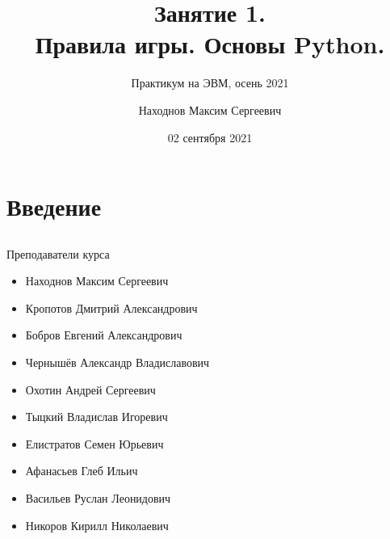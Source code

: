 \documentclass[11pt, fleqn, xcolor=x11names]{beamer}
\title[Введение в Python]{\bfseries Занятие 1. \\ Правила игры. Основы Python.}
\author[Находнов~М.\,С.]{Находнов Максим Сергеевич}
\subtitle{Практикум на ЭВМ, осень 2021}
\institute[OM]{кафедра ММП, ВМК МГУ}
\date{02 сентября 2021}
\begin{document}
\begin{frame}
\maketitle
\end{frame} 

\section{Введение}
\subsection*{}




\begin{frame}{Преподаватели курса}
	\begin{itemize}
		\item Находнов Максим Сергеевич
		\item Кропотов Дмитрий Александрович
		\item Бобров Евгений Александрович
		\item Чернышёв Александр Владиславович
		\item Охотин Андрей Сергеевич
		\item Тыцкий Владислав Игоревич
		\item Елистратов Семен Юрьевич
		\item Афанасьев Глеб Ильич
		\item Васильев Руслан Леонидович
		\item Никоров Кирилл Николаевич
	\end{itemize}
\end{frame}
\end{document}
